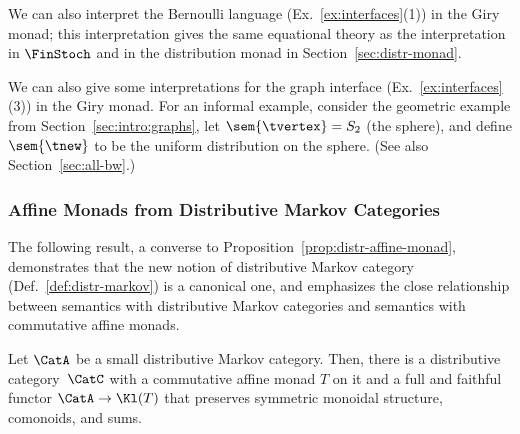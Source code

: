 We can also interpret the Bernoulli language (Ex.~\ref{ex:interfaces}(1)) in the Giry monad; this interpretation gives the same equational theory as the interpretation in $\FinStoch$ and in the distribution monad in Section~\ref{sec:distr-monad}.

    We can also give some interpretations for the graph interface
    (Ex.~\ref{ex:interfaces}(3)) in the Giry monad.
    For an informal example, consider the geometric example from Section~\ref{sec:intro:graphs}, let $\sem{\tvertex}=S_2$ (the sphere), and define $\sem{\tnew}$ to be the uniform distribution on the sphere.
    (See also Section~\ref{sec:all-bw}.) 

    \subsubsection{Affine Monads from Distributive Markov Categories}\label{sec:dmc-to-am}
    The following result, a converse to Proposition~\ref{prop:distr-affine-monad}, demonstrates that the new notion of distributive Markov category (Def.~\ref{def:distr-markov}) is a canonical one, and emphasizes the close relationship between semantics with distributive Markov categories and semantics with commutative affine monads. 
\begin{proposition}\label{prop:markov-embed-kleisli}
  Let $\CatA$ be a small distributive Markov category.
  Then, there is a distributive category~$\CatC$ with a commutative affine monad $T$ on it
  and a full and faithful functor $\CatA\to \Kl(T)$ that preserves
  symmetric monoidal structure, comonoids, and sums.
\end{proposition}

